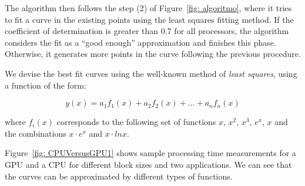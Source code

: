 \documentclass[journal]{IEEEtran}
\begin{document}
The algorithm then follows the step (2) of Figure~\ref{fig: algoritmo}, where it
tries to fit a curve in the existing points using the least squares fitting
method. If the coefficient of determination is greater than 0.7 for all
processors, the algorithm considers the fit as a ``good enough'' approximation and finishes this
phase. Otherwise, it generates more points in the curve following the previous
procedure.
 

We devise the best fit curves using the well-known method of \textit{least
  squares}, using a function of the form:

\begin{equation}
 y(x) = a_{1} f_{1}(x) +  a_{2} f_{2}(x) + ... + a_{n} f_{n}(x) 
\label{eq: least}
\end{equation} 

where $ f_i (x) $ corresponds to the following set of functions $x$, $x^2$, $x^3$, $e^x$, $x$ and the combinations $x \cdot e^x$ and $x \cdot lnx$.

Figure~\ref{fig: CPUVersusGPU1} shows sample processing time measurements for a
GPU and a CPU for different block sizes and two applications. We can see that
the curves can be approximated by different types of functions.
\end{document}
